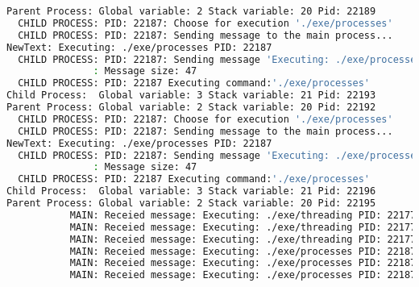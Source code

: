 \documentclass{article}
\begin{document}
\begin{lstlisting}[language=BASH]
Parent Process: Global variable: 2 Stack variable: 20 Pid: 22189
  CHILD PROCESS: PID: 22187: Choose for execution './exe/processes'
  CHILD PROCESS: PID: 22187: Sending message to the main process...
NewText: Executing: ./exe/processes PID: 22187
  CHILD PROCESS: PID: 22187: Sending message 'Executing: ./exe/processes PID: 22187' to the MAIN process...
               : Message size: 47
  CHILD PROCESS: PID: 22187 Executing command:'./exe/processes'
Child Process:  Global variable: 3 Stack variable: 21 Pid: 22193
Parent Process: Global variable: 2 Stack variable: 20 Pid: 22192
  CHILD PROCESS: PID: 22187: Choose for execution './exe/processes'
  CHILD PROCESS: PID: 22187: Sending message to the main process...
NewText: Executing: ./exe/processes PID: 22187
  CHILD PROCESS: PID: 22187: Sending message 'Executing: ./exe/processes PID: 22187' to the MAIN process...
               : Message size: 47
  CHILD PROCESS: PID: 22187 Executing command:'./exe/processes'
Child Process:  Global variable: 3 Stack variable: 21 Pid: 22196
Parent Process: Global variable: 2 Stack variable: 20 Pid: 22195
           MAIN: Receied message: Executing: ./exe/threading PID: 22177
           MAIN: Receied message: Executing: ./exe/threading PID: 22177
           MAIN: Receied message: Executing: ./exe/threading PID: 22177
           MAIN: Receied message: Executing: ./exe/processes PID: 22187
           MAIN: Receied message: Executing: ./exe/processes PID: 22187
           MAIN: Receied message: Executing: ./exe/processes PID: 22187
\end{lstlisting}
\end{document}
